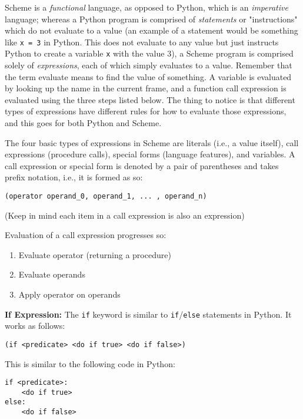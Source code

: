 Scheme is a \textit{functional} language, as opposed to Python, which is an \textit{imperative} language; whereas a Python program is comprised of \textit{statements} or "instructions" which do not evaluate to a value (an example of a statement would be something like \lstinline{x = 3} in Python. This does not evaluate to any value but just instructs Python to create a variable \lstinline{x} with the value 3), a Scheme program is comprised solely of \textit{expressions}, each of which simply evaluates to a value. Remember that the term evaluate means to find the value of something. A variable is evaluated by looking up the name in the current frame, and a function call expression is evaluated using the three steps listed below. The thing to notice is that different types of expressions have different rules for how to evaluate those expressions, and this goes for both Python and Scheme. 

The four basic types of expressions in Scheme are literals (i.e., a value itself), call expressions (procedure calls), special forms (language features), and variables.  A call expression or special form is denoted by a pair of parentheses and takes prefix notation, i.e., it is formed as so:
\vspace{0.5mm}
\begin{lstlisting}
(operator operand_0, operand_1, ... , operand_n)
\end{lstlisting}

(Keep in mind each item in a call expression is also an expression)

Evaluation of a call expression progresses so:
\begin{enumerate}
\item Evaluate operator (returning a procedure)
\item Evaluate operands
\item Apply operator on operands
\end{enumerate}

\newpage 

\textbf{If Expression: }
The \lstinline{if} keyword is similar to \lstinline{if}/\lstinline{else} statements in Python. It works as follows:

\begin{lstlisting}
(if <predicate> <do if true> <do if false>)
\end{lstlisting}

This is similar to the following code in Python:

\begin{lstlisting}
if <predicate>:
    <do if true>
else:
    <do if false>
\end{lstlisting}

